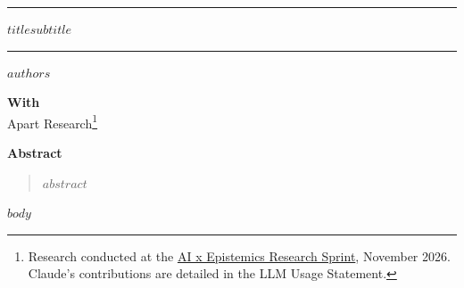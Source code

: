 \documentclass[11pt]{article}
\begin{document}
\begingroup
\renewcommand{\thefootnote}{\arabic{footnote}}
\noindent\rule{\textwidth}{1.2pt}
\vspace{4pt}
\begin{center}
{\bfseries\fontsize{20}{24}\selectfont $title$$subtitle$}
\end{center}
\vspace{2pt}
\noindent\rule{\textwidth}{0.6pt}
\begin{center}
$authors$

\vspace{6pt}
\textbf{With}\\
Apart Research\footnote{Research conducted at the \href{https://apartresearch.com/sprints/ai-x-epistemics-research-sprint-2026-11-13-to-2026-11-15}{AI x Epistemics Research Sprint}, November 2026. Claude's contributions are detailed in the LLM Usage Statement.}
\end{center}
\endgroup

\begin{center}
{\bfseries\fontsize{14}{17}\selectfont Abstract}
\end{center}
\vspace{-6pt}
\begin{quote}
\itshape $abstract$
\end{quote}

$body$
\end{document}
